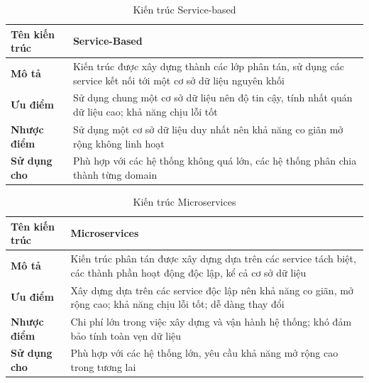 \begin{table}[h]
	\begin{tabular}{|p{3cm}|p{12cm}|}
		\hline
		\textbf{Tên kiến trúc} & Service-Based                                                                                                 \\
		\hline
		\textbf{Mô tả}         & Kiến trúc được xây dựng thành các lớp phân tán, sử dụng các service kết nối tới một cơ sở dữ liệu nguyên khối \\
		\hline
		\textbf{Ưu điểm}       & Sử dụng chung một cơ sở dữ liệu nên độ tin cậy, tính nhất quán dữ liệu cao; khả năng chịu lỗi tốt             \\
		\hline
		\textbf{Nhược điểm}    & Sử dụng một cơ sở dữ liệu duy nhất nên khả năng co giãn mở rộng không linh hoạt                               \\
		\hline
		\textbf{Sử dụng cho}   & Phù hợp với các hệ thống không quá lớn, các hệ thống phân chia thành từng domain                              \\
		\hline
	\end{tabular}
	\caption{Kiến trúc Service-based}
\end{table}

\newpage

\begin{table}[h]
	\begin{tabular}{|p{3cm}|p{12cm}|}
		\hline
		\textbf{Tên kiến trúc} & Microservices                                                                                                          \\
		\hline
		\textbf{Mô tả}         & Kiến trúc phân tán được xây dựng dựa trên các service tách biệt, các thành phần hoạt động độc lập, kể cả cơ sở dữ liệu \\
		\hline
		\textbf{Ưu điểm}       & Xây dựng dựa trên các service độc lập nên khả năng co giãn, mở rộng cao; khả năng chịu lỗi tốt; dễ dàng thay đổi       \\
		\hline
		\textbf{Nhược điểm}    & Chi phí lớn trong việc xây dựng và vận hành hệ thống; khó đảm bảo tính toàn vẹn dữ liệu                                \\
		\hline
		\textbf{Sử dụng cho}   & Phù hợp với các hệ thống lớn, yêu cầu khả năng mở rộng cao trong tương lai                                             \\
		\hline
	\end{tabular}
	\caption{Kiến trúc Microservices}
\end{table}

